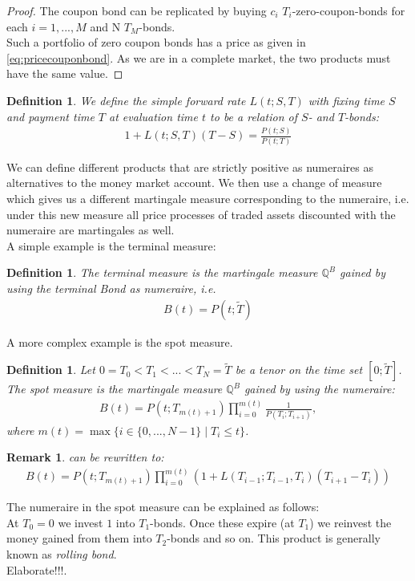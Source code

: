 \documentclass[12pt]{article}
\newtheorem{remark}[theorem]{Remark}
\newtheorem{definition}[theorem]{Definition}
\begin{document}
	\begin{proof}
		The coupon bond can be replicated by buying $c_i$ $T_i$-zero-coupon-bonds for each $i=1, ..., M$ and N $T_M$-bonds.\\
		Such a portfolio of zero coupon bonds has a price as given in \cref{eq:pricecouponbond}. As we are in a complete market, the two products must have the same value.
	\end{proof}
	\begin{definition}\label{def:simpleFR}
		We define the \emph{simple forward rate} $L(t;S,T)$ with fixing time $S$ and payment time $T$ at evaluation time $t$ to be a relation of $S$- and $T$-bonds:
		\begin{align}
			1 + L(t;S,T)(T - S) = \frac{P(t;S)}{P(t;T)}
		\end{align}
	\end{definition}
	We can define different products that are strictly positive as numeraires as alternatives to the money market account. We then use a change of measure which gives us a different martingale measure corresponding to the numeraire, i.e. under this new measure all price processes of traded assets discounted with the numeraire are martingales as well.\\
	A simple example is the terminal measure:
	\begin{definition}
		The \emph{terminal measure} is the martingale measure $\mathbb{Q}^B$ gained by using the terminal Bond as numeraire, i.e. 
		\begin{align}\label{eq:terminalNumeraire}
			B(t) = P(t;\tilde{T})
		\end{align}
	\end{definition}
	A more complex example is the spot measure.
	\begin{definition}
		Let $0 = T_0 < T_1 < ... < T_N = \tilde{T}$ be a tenor on the time set $[0;\tilde{T}]$.\\
		The \emph{spot measure} is the martingale measure $\mathbb{Q}^B$ gained by using the numeraire:
		\begin{align}\label{eq:spotNumeraire}
			B(t) = P(t;T_{m(t)+1})\prod_{i=0}^{m(t)}\frac{1}{P(T_{i};T_{i+1})},
		\end{align}
		where $m(t) = \max\{i \in \{0, ..., N-1\} \; | \; T_i \le t \}$.
	\end{definition}
	\begin{remark}
		 can be rewritten to:
		\begin{align}\label{eq:spotNumeraireAlt}
			B(t) = P(t;T_{m(t)+1})\prod_{i=0}^{m(t)}(1 + L(T_{i-1};T_{i-1},T_i)(T_{i+1}-T_i))
		\end{align}
	\end{remark}
	The numeraire in the spot measure can be explained as follows:\\
	At $T_0 = 0$ we invest $1$ into $T_1$-bonds. Once these expire (at $T_1$) we reinvest the money gained from them into $T_2$-bonds and so on.
	This product is generally known as \emph{rolling bond}.\\
	\color{red}Elaborate!!!\color{black}. 
	
\end{document}
